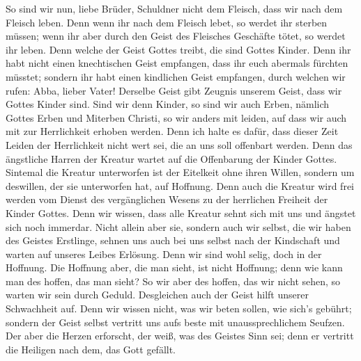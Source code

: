  So sind wir nun, liebe Brüder, Schuldner nicht dem
Fleisch, dass wir nach dem Fleisch leben.  Denn wenn ihr
nach dem Fleisch lebet, so werdet ihr sterben müssen; wenn ihr aber
durch den Geist des Fleisches Geschäfte tötet, so werdet ihr leben.
 Denn welche der Geist Gottes treibt, die sind Gottes
Kinder.  Denn ihr habt nicht einen knechtischen Geist
empfangen, dass ihr euch abermals fürchten müsstet; sondern ihr habt
einen kindlichen Geist empfangen, durch welchen wir rufen: Abba, lieber
Vater!  Derselbe Geist gibt Zeugnis unserem Geist, dass
wir Gottes Kinder sind.  Sind wir denn Kinder, so sind
wir auch Erben, nämlich Gottes Erben und Miterben Christi, so wir anders
mit leiden, auf dass wir auch mit zur Herrlichkeit erhoben werden.
 Denn ich halte es dafür, dass dieser Zeit Leiden der
Herrlichkeit nicht wert sei, die an uns soll offenbart werden.
 Denn das ängstliche Harren der Kreatur wartet auf die
Offenbarung der Kinder Gottes.  Sintemal die Kreatur
unterworfen ist der Eitelkeit ohne ihren Willen, sondern um deswillen,
der sie unterworfen hat, auf Hoffnung.  Denn auch die
Kreatur wird frei werden vom Dienst des vergänglichen Wesens zu der
herrlichen Freiheit der Kinder Gottes.  Denn wir wissen,
dass alle Kreatur sehnt sich mit uns und ängstet sich noch immerdar.
 Nicht allein aber sie, sondern auch wir selbst, die wir
haben des Geistes Erstlinge, sehnen uns auch bei uns selbst nach der
Kindschaft und warten auf unseres Leibes Erlösung.  Denn
wir sind wohl selig, doch in der Hoffnung. Die Hoffnung aber, die man
sieht, ist nicht Hoffnung; denn wie kann man des hoffen, das man sieht?
 So wir aber des hoffen, das wir nicht sehen, so warten
wir sein durch Geduld.  Desgleichen auch der Geist hilft
unserer Schwachheit auf. Denn wir wissen nicht, was wir beten sollen,
wie sich's gebührt; sondern der Geist selbst vertritt uns aufs beste mit
unaussprechlichem Seufzen.  Der aber die Herzen
erforscht, der weiß, was des Geistes Sinn sei; denn er vertritt die
Heiligen nach dem, das Gott gefällt.


